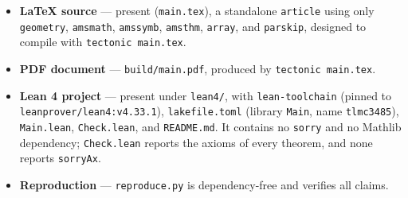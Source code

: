 \documentclass[11pt]{article}
\theoremstyle{definition}
\theoremstyle{remark}
\begin{document}
\begin{itemize}
\item \textbf{LaTeX source} --- present (\texttt{main.tex}), a standalone
      \texttt{article} using only \texttt{geometry}, \texttt{amsmath},
      \texttt{amssymb}, \texttt{amsthm}, \texttt{array}, and \texttt{parskip},
      designed to compile with \texttt{tectonic main.tex}.
\item \textbf{PDF document} --- \texttt{build/main.pdf}, produced by
      \texttt{tectonic main.tex}.
\item \textbf{Lean 4 project} --- present under \texttt{lean4/}, with
      \texttt{lean-toolchain} (pinned to \texttt{leanprover/lean4:v4.33.1}),
      \texttt{lakefile.toml} (library \texttt{Main}, name \texttt{tlmc3485}),
      \texttt{Main.lean}, \texttt{Check.lean}, and \texttt{README.md}. It
      contains no \texttt{sorry} and no Mathlib dependency; \texttt{Check.lean}
      reports the axioms of every theorem, and none reports \texttt{sorryAx}.
\item \textbf{Reproduction} --- \texttt{reproduce.py} is dependency-free and
      verifies all claims.
\end{itemize}
\end{document}
